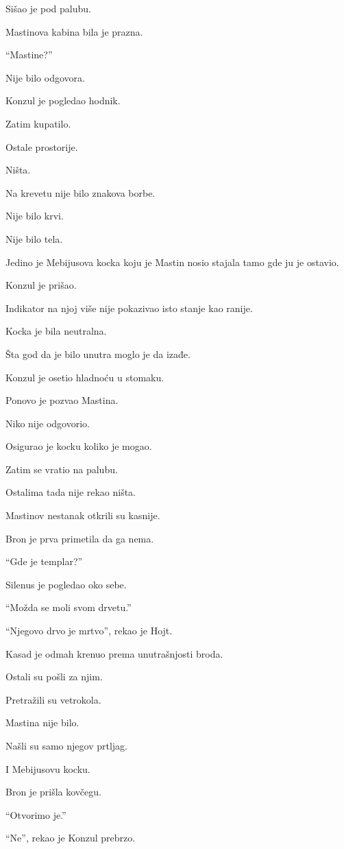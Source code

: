 Sišao je pod palubu.

Mastinova kabina bila je prazna.

``Mastine?''

Nije bilo odgovora.

Konzul je pogledao hodnik.

Zatim kupatilo.

Ostale prostorije.

Ništa.

Na krevetu nije bilo znakova borbe.

Nije bilo krvi.

Nije bilo tela.

Jedino je Mebijusova kocka koju je Mastin nosio stajala tamo gde ju je ostavio.

Konzul je prišao.

Indikator na njoj više nije pokazivao isto stanje kao ranije.

Kocka je bila neutralna.

Šta god da je bilo unutra moglo je da izađe.

Konzul je osetio hladnoću u stomaku.

Ponovo je pozvao Mastina.

Niko nije odgovorio.

Osigurao je kocku koliko je mogao.

Zatim se vratio na palubu.

Ostalima tada nije rekao ništa.

\bigskip

Mastinov nestanak otkrili su kasnije.

Bron je prva primetila da ga nema.

``Gde je templar?''

Silenus je pogledao oko sebe.

``Možda se moli svom drvetu.''

``Njegovo drvo je mrtvo'', rekao je Hojt.

Kasad je odmah krenuo prema unutrašnjosti broda.

Ostali su pošli za njim.

Pretražili su vetrokola.

Mastina nije bilo.

Našli su samo njegov prtljag.

I Mebijusovu kocku.

Bron je prišla kovčegu.

``Otvorimo je.''

``Ne'', rekao je Konzul prebrzo.

